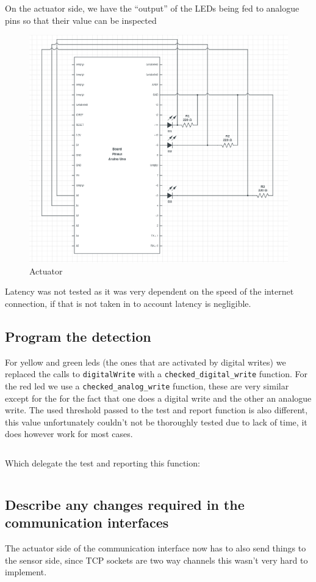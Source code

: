 \documentclass[10pt]{article}
\begin{document}
On the actuator side, we have the ``output'' of the LEDs being fed to analogue
pins so that their value can be inspected

\begin{figure}[H]
    \centering
    \includegraphics[width=\textwidth]{actuator.png}
    \caption{Actuator}
\end{figure}

Latency was not tested as it was very dependent on the speed of the internet
connection, if that is not taken in to account latency is negligible.

\subsection{Program the detection}

For yellow and green leds (the ones that are activated by digital writes) we
replaced the calls to \texttt{digitalWrite} with a
\texttt{checked\_digital\_write} function. For the red led we use a
\texttt{checked\_analog\_write} function, these are very similar except for the
for the fact that one does a digital write and the other an analogue write. The
used threshold passed to the test and report function is also different, this
value unfortunately couldn't not be thoroughly tested due to lack of time, it does
however work for most cases.

\inputminted[firstline=14, lastline=22]{cpp}{../arduino/actuators/actuators.hpp}

Which delegate the test and reporting this function:

\inputminted[firstline=29, lastline=35]{cpp}{../arduino/actuators/actuators.hpp}


\subsection{Describe any changes required in the communication interfaces}

The actuator side of the communication interface now has to also send things to
the sensor side, since TCP sockets are two way channels this wasn't very hard to
implement.
\end{document}
